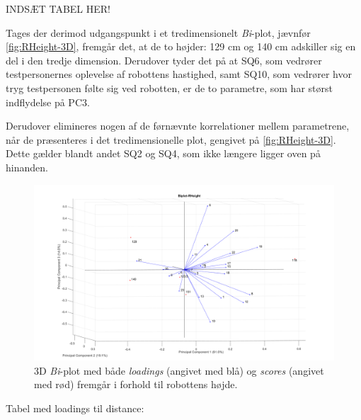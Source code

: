 INDSÆT TABEL HER!\blankline


Tages der derimod udgangspunkt i et tredimensionelt \textit{Bi}-plot, jævnfør \autoref{fig:RHeight-3D}, fremgår det, at de to højder: 129 cm og 140 cm adskiller sig en del i den tredje dimension. Derudover tyder det på at SQ6, som vedrører testpersonernes oplevelse af robottens hastighed, samt SQ10, som vedrører hvor tryg testpersonen følte sig ved robotten, er de to parametre, som har størst indflydelse på PC3. 

Derudover elimineres nogen af de førnævnte korrelationer mellem parametrene, når de præsenteres i det tredimensionelle plot, gengivet på \autoref{fig:RHeight-3D}. Dette gælder blandt andet SQ2 og SQ4, som ikke længere ligger oven på hinanden.   
%
\begin{figure}[H]
\centering
\includegraphics[width=\textwidth]{Figure/DatabehandlingSkalaer/PCAfigures/RHeight-3D.png}
\caption{3D \textit{Bi}-plot med både \textit{loadings} (angivet med blå) og \textit{scores} (angivet med rød) fremgår i forhold til robottens højde.}
\label{fig:RHeight-3D}
\end{figure}
%




Tabel med loadings til distance:

